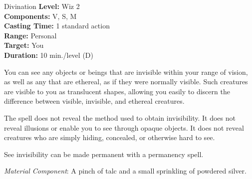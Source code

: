 {Divination}
{
	\textbf{Level:}
	Wiz 2\\
	\textbf{Components:}
	V, S, M\\
	\textbf{Casting Time:}
	1 standard action\\
	\textbf{Range:}
	Personal\\
	\textbf{Target:}
	You\\
	\textbf{Duration:}
	10 min./level (D)\\
}
{
	You can see any objects or beings that are invisible within your range of vision, as well as any that are ethereal, as if they were normally visible. Such creatures are visible to you as translucent shapes, allowing you easily to discern the difference between visible, invisible, and ethereal creatures.

	The spell does not reveal the method used to obtain invisibility. It does not reveal illusions or enable you to see through opaque objects. It does not reveal creatures who are simply hiding, concealed, or otherwise hard to see.

	See invisibility can be made permanent with a permanency spell.

	\textit{Material Component}:
	A pinch of talc and a small sprinkling of powdered silver.

}
